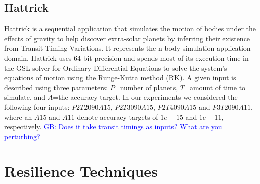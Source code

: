 \documentclass[10pt, conference, compsocconf]{IEEEtran}
\newcommand{\sui}[1]{%
  \textcolor{green}{SC-#1}
}
\newcommand{\greg}[1]{%
  \textcolor{blue}{GB: #1}
}
\begin{document}
\subsection{Hattrick}
\label{sec:apps:hattrick}
Hattrick is a sequential application that simulates the motion of bodies under the effects of gravity to help discover extra-solar planets by inferring their existence from Transit Timing Variations.
It represents the n-body simulation application domain.
Hattrick uses 64-bit precision and spends most of its execution time in the GSL solver for Ordinary Differential Equations to solve the system's equations of motion using the Runge-Kutta method (RK).
A given input is described using three parameters: $P$=number of planets, $T$=amount of time to simulate, and $A$=the accuracy target.
In our experiments we considered the following four inputs: $P2T2090A15$, $P2T3090A15$, $P2T4090A15$ and $P3T2090A11$, where an $A15$ and $A11$ denote accuracy targets of $1e-15$ and $1e-11$, respectively.
\greg{Does it take transit timings as inputs? What are you perturbing?}


\section{Resilience Techniques}
\label{sec:res_tech}
\end{document}
